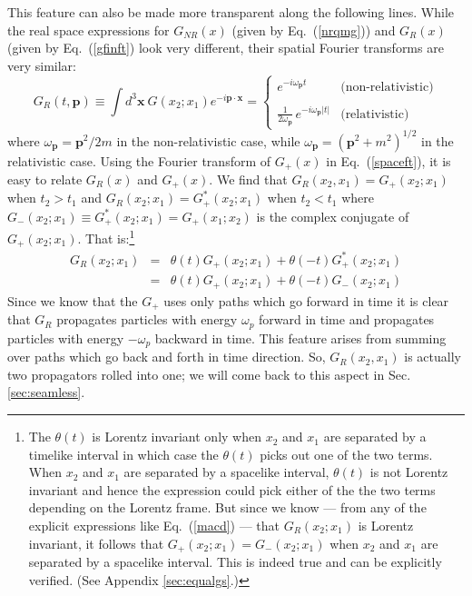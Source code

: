 \documentclass[12pt]{article}
\def\eq#1{{Eq.~(\ref{#1})}}
\begin{document}
 
 
 


This feature can also be made more  transparent along the following lines. While the real space expressions for $G_{NR}(x)$ (given by \eq{nrqmg}) and $G_R(x)$ (given by \eq{gfinft} look very different, their spatial Fourier transforms are very   similar:
\begin{equation}
G_R(t,\bm{p}) \equiv \int d^3\bm{x}\ G(x_2;x_1) e^{-i\bm{p\cdot x}} = 
\begin{cases}
   e^{-i\omega_{\bm{p}}t} &\text{(non-relativistic)}\\
{ } \\
{\displaystyle{\frac{1}{2\omega_{\bm{p}}}}}\, e^{-i\omega_{\bm{p}}|t|} &\text{(relativistic)}
\end{cases}
\label{nrrcomp1}
\end{equation}
where $\omega_{\bm{p}}= \bm{p}^2/2m$ in the non-relativistic case, while $\omega_{\bm{p}}= (\bm{p}^2+m^2)^{1/2}$ in the relativistic case. 
Using the Fourier transform of $G_+(x)$ in \eq{spaceft}, it is easy to relate $G_R(x)$ and $G_+(x)$. We find that
$ G_R(x_2,x_1)=G_+(x_2;x_1)$ when $t_2>t_1$ and $G_R(x_2;x_1)=G_+^*(x_2;x_1)$ when $t_2<t_1$ where $G_-(x_2;x_1) \equiv  G_+^*(x_2;x_1)=G_+(x_1;x_2)$
is the complex conjugate of $G_+(x_2;x_1)$. That is:\footnote{The $\theta(t)$ is Lorentz invariant only when $x_2$ and $x_1$ are separated by a timelike interval in which case the $\theta(t)$ picks out one of the two terms. When $x_2$ and $x_1$ are separated by a spacelike interval, $\theta(t)$ is not Lorentz invariant and hence the expression could pick either of the the two terms depending on the Lorentz frame. But since we know --- from any of the explicit expressions like \eq{macd} --- that $G_R(x_2;x_1)$ is Lorentz invariant, it follows that $G_+(x_2;x_1)=G_-(x_2;x_1)$ when $x_2$ and $x_1$ are separated by a spacelike interval. This is indeed true and can be explicitly verified. (See Appendix \ref{sec:equalgs}.)}
\begin{eqnarray}
 G_R(x_2;x_1) &=& \theta(t) G_+(x_2;x_1) + \theta(-t)G_+^*(x_2;x_1)\nonumber\\
 &=& \theta(t) G_+(x_2;x_1) + \theta(-t)G_-(x_2;x_1)
\label{amppmnew}
\end{eqnarray}
Since we know that the $G_+$ uses only paths which go forward in time it is clear that
$G_R$ propagates particles with energy $\omega_p$ forward in time and propagates particles with energy $-\omega_p$ backward in time.
This feature arises from summing over paths which go back and forth in time direction.
So, $G_R(x_2,x_1)$ is actually two propagators rolled into one; we will come back to this aspect in Sec.\ref{sec:seamless}.
\end{document}
